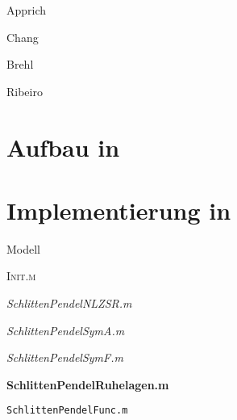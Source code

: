 Apprich \cite{apprich}

Chang \cite{chang}

Brehl \cite{brehl}

Ribeiro \cite{ribeiro}


\section{Aufbau in \Simulink}



\section{Implementierung in \Matlab}

Modell

\textsc{Init.m}

\emph{SchlittenPendelNLZSR.m}

\textit{SchlittenPendelSymA.m}

\textsl{SchlittenPendelSymF.m}

\textbf{SchlittenPendelRuhelagen.m}

\texttt{SchlittenPendelFunc.m}